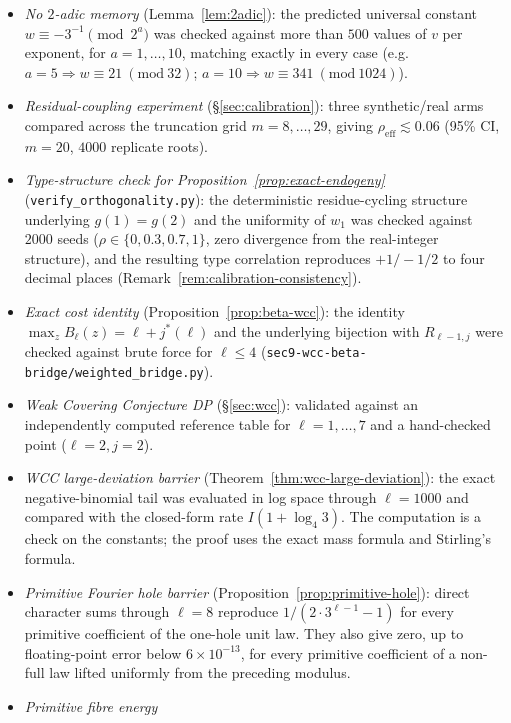 \documentclass[11pt]{article}
\theoremstyle{definition}
\theoremstyle{remark}
\begin{document}
\begin{itemize}
\item \emph{No $2$-adic memory} (Lemma~\ref{lem:2adic}): the predicted
  universal constant $w\equiv-3^{-1}\pmod{2^a}$ was checked against
  more than $500$ values of $v$ per exponent, for $a=1,\dots,10$,
  matching exactly in every case (e.g.\ $a=5\Rightarrow w\equiv21\
  (\mathrm{mod}\ 32)$; $a=10\Rightarrow w\equiv341\ (\mathrm{mod}\
  1024)$).
\item \emph{Residual-coupling experiment} (\S\ref{sec:calibration}):
  three synthetic/real arms compared across the truncation grid
  $m=8,\dots,29$, giving $\rho_{\mathrm{eff}}\lesssim0.06$ (95\% CI,
  $m=20$, $4000$ replicate roots).
\item \emph{Type-structure check for Proposition~\ref{prop:exact-endogeny}}
  (\texttt{verify\_orthogonality.py}): the deterministic residue-cycling
  structure underlying $g(1)=g(2)$ and the uniformity of $w_1$ was
  checked against $2000$ seeds ($\rho\in\{0,0.3,0.7,1\}$, zero
  divergence from the real-integer structure), and the resulting type
  correlation reproduces $+1/-1/2$ to four decimal places
  (Remark~\ref{rem:calibration-consistency}).
\item \emph{Exact cost identity} (Proposition~\ref{prop:beta-wcc}):
  the identity $\max_zB_\ell(z)=\ell+j^\ast(\ell)$ and the underlying
  bijection with $R_{\ell-1,j}$ were checked against brute force for
  $\ell\le4$ (\texttt{sec9-wcc-beta-bridge/weighted\_bridge.py}).
\item \emph{Weak Covering Conjecture DP} (\S\ref{sec:wcc}): validated
  against an independently computed reference table for
  $\ell=1,\dots,7$ and a hand-checked point ($\ell=2,j=2$).
\item \emph{WCC large-deviation barrier}
  (Theorem~\ref{thm:wcc-large-deviation}): the exact negative-binomial
  tail was evaluated in log space through $\ell=1000$ and compared
  with the closed-form rate $I(1+\log_4 3)$. The computation is a
  check on the constants; the proof uses the exact mass formula and
  Stirling's formula.
\item \emph{Primitive Fourier hole barrier}
  (Proposition~\ref{prop:primitive-hole}): direct character sums through
  $\ell=8$ reproduce $1/(2\cdot3^{\ell-1}-1)$ for every primitive
  coefficient of the one-hole unit law. They also give zero, up to
  floating-point error below $6\times10^{-13}$, for every primitive
  coefficient of a non-full law lifted uniformly from the preceding
  modulus.
\item \emph{Primitive fibre energy}

\end{itemize}
\end{document}
